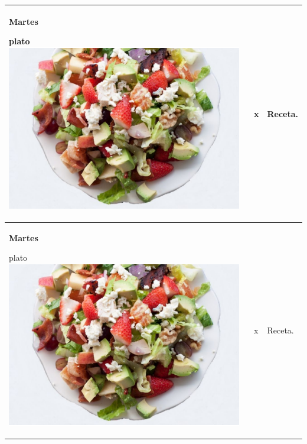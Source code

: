 \documentclass[menu.tex]{subfiles}
\begin{document}
\begin{tabular} {p{3.5cm} p{4cm} p{9cm}}
    \pbox{20cm}
    {
        \rule{0pt}{3ex}\begin{large}\textbf{Martes}\end{large}\\ 
        \rule{0pt}{2ex}plato\\
        \includegraphics[scale=0.35]{ensalada-vegetal-con-carne} 
    } & 
    \vspace{-1.75cm}            
    \begin{compactitem} 
        \begin{scriptsize}
            \item x
        \end{scriptsize}
    \end{compactitem}&
    \vspace{-1.7cm}
    Receta.\\
    
\hline

    \pbox{20cm}
    {
        \rule{0pt}{3ex}\begin{large}\textbf{Martes}\end{large}\\ 
        \rule{0pt}{2ex}plato\\
        \includegraphics[scale=0.35]{ensalada-vegetal-con-carne} 
    } & 
    \vspace{-1.75cm}            
    \begin{compactitem} 
        \begin{scriptsize}
            \item x
        \end{scriptsize}
    \end{compactitem}&
    \vspace{-1.7cm}
    Receta.\\
    \hline


\end{tabular}
\end{document}
